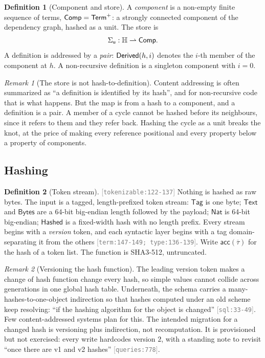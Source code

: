 \documentclass[11pt]{article}
\theoremstyle{definition}
\newtheorem{definition}{Definition}[section]
\theoremstyle{plain}
\theoremstyle{remark}
\newtheorem{remark}{Remark}[section]
\newcommand{\src}[1]{{\footnotesize\textcolor{gray}{[\texttt{#1}]}}}
\begin{document}
\begin{definition}[Component and store]\label{def:ustore}
A \emph{component} is a non-empty finite sequence of terms, $\mathsf{Comp} = \mathsf{Term}^{+}$: a strongly connected
component of the dependency graph, hashed as a unit. The store is
\[
  \Sigma_{\mathsf{u}} : \mathbb{H} \rightharpoonup \mathsf{Comp} .
\]
A definition is addressed by a \emph{pair}: $\mathsf{Derived}(h,i)$ denotes the $i$-th member of the component
at $h$. A non-recursive definition is a singleton component with $i = 0$.
\end{definition}

\begin{remark}[The store is not hash-to-definition]\label{rem:storetype}
Content addressing is often summarized as ``a definition is identified by its hash'', and for
non-recursive code that is what happens. But the map is from a hash to a component, and a definition
is a pair. A member of a cycle cannot be hashed before its neighbours, since it refers to them and
they refer back. Hashing the cycle as a unit breaks the knot, at the price of making every reference
positional and every property below a property of components.
\end{remark}

\subsection{Hashing}

\begin{definition}[Token stream]\label{def:tokens}
\src{tokenizable:122-137} Nothing is hashed as raw bytes. The input is a tagged,
length-prefixed token stream: $\mathsf{Tag}$ is one byte; $\mathsf{Text}$ and $\mathsf{Bytes}$ are a
64-bit big-endian length followed by the payload; $\mathsf{Nat}$ is 64-bit big-endian;
$\mathsf{Hashed}$ is a fixed-width hash with no length prefix. Every stream begins with a
\emph{version} token, and each syntactic layer begins with a tag domain-separating it from the others
\src{term:147-149; type:136-139}. Write $\mathsf{acc}(\overline{\tau})$ for the hash of a token list.
The function is SHA3-512, untruncated.
\end{definition}

\begin{remark}[Versioning the hash function]\label{rem:version}
The leading version token makes a change of hash function change every hash, so simple values cannot
collide across generations in one global hash table. Underneath, the schema carries a
many-hashes-to-one-object indirection so that hashes computed under an old scheme keep resolving: ``if
the hashing algorithm for the object is changed'' \src{sql:33-49}. Few content-addressed systems plan
for this. The intended migration for a changed hash is versioning plus indirection, not
recomputation. It is provisioned but not exercised: every write hardcodes version $2$, with a
standing note to revisit ``once there are v1 and v2 hashes'' \src{queries:778}.
\end{remark}
\end{document}
